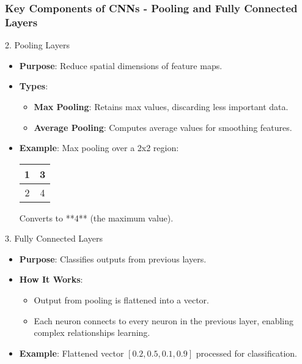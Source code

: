 \documentclass[aspectratio=169]{beamer}
\begin{document}
\begin{frame}[fragile]
    \frametitle{Key Components of CNNs - Pooling and Fully Connected Layers}
    \begin{block}{2. Pooling Layers}
        \begin{itemize}
            \item \textbf{Purpose}: Reduce spatial dimensions of feature maps.
            \item \textbf{Types}:
            \begin{itemize}
                \item \textbf{Max Pooling}: Retains max values, discarding less important data.
                \item \textbf{Average Pooling}: Computes average values for smoothing features.
            \end{itemize}
            \item \textbf{Example}: Max pooling over a 2x2 region:
            \begin{center}
                \begin{tabular}{|c|c|}
                    \hline
                    1 & 3 \\ \hline
                    2 & 4 \\ \hline
                \end{tabular}
            \end{center}
            Converts to **4** (the maximum value).
        \end{itemize}
    \end{block}

    \begin{block}{3. Fully Connected Layers}
        \begin{itemize}
            \item \textbf{Purpose}: Classifies outputs from previous layers.
            \item \textbf{How It Works}:
            \begin{itemize}
                \item Output from pooling is flattened into a vector.
                \item Each neuron connects to every neuron in the previous layer, enabling complex relationships learning.
            \end{itemize}
            \item \textbf{Example}: Flattened vector \([0.2, 0.5, 0.1, 0.9]\) processed for classification.
        \end{itemize}
    \end{block}
\end{frame}
\end{document}
